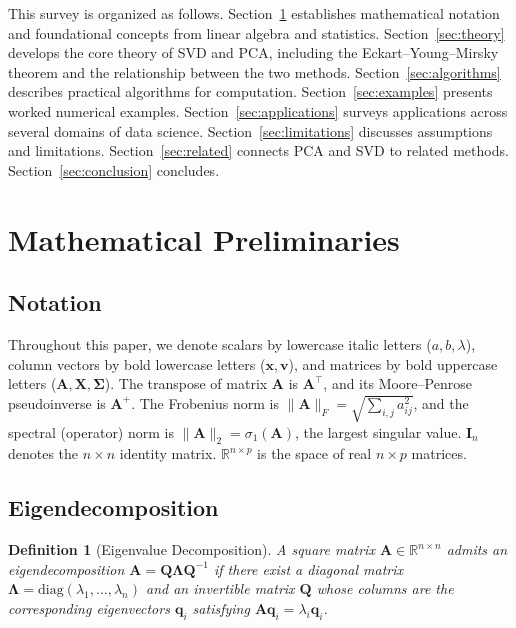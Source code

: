\documentclass[conference]{IEEEtran}
\newtheorem{definition}{Definition}
\begin{document}
This survey is organized as follows. Section~\ref{sec:prelim} establishes mathematical notation and foundational concepts from linear algebra and statistics. Section~\ref{sec:theory} develops the core theory of SVD and PCA, including the Eckart--Young--Mirsky theorem and the relationship between the two methods. Section~\ref{sec:algorithms} describes practical algorithms for computation. Section~\ref{sec:examples} presents worked numerical examples. Section~\ref{sec:applications} surveys applications across several domains of data science. Section~\ref{sec:limitations} discusses assumptions and limitations. Section~\ref{sec:related} connects PCA and SVD to related methods. Section~\ref{sec:conclusion} concludes.

\section{Mathematical Preliminaries}
\label{sec:prelim}

\subsection{Notation}

Throughout this paper, we denote scalars by lowercase italic letters ($a, b, \lambda$), column vectors by bold lowercase letters ($\mathbf{x}, \mathbf{v}$), and matrices by bold uppercase letters ($\mathbf{A}, \mathbf{X}, \mathbf{\Sigma}$). The transpose of matrix $\mathbf{A}$ is $\mathbf{A}^\top$, and its Moore--Penrose pseudoinverse is $\mathbf{A}^+$. The Frobenius norm is $\|\mathbf{A}\|_F = \sqrt{\sum_{i,j} a_{ij}^2}$, and the spectral (operator) norm is $\|\mathbf{A}\|_2 = \sigma_1(\mathbf{A})$, the largest singular value. $\mathbf{I}_n$ denotes the $n\times n$ identity matrix. $\mathbb{R}^{n \times p}$ is the space of real $n\times p$ matrices.

\subsection{Eigendecomposition}

\begin{definition}[Eigenvalue Decomposition]
A square matrix $\mathbf{A} \in \mathbb{R}^{n \times n}$ admits an \emph{eigendecomposition} $\mathbf{A} = \mathbf{Q}\mathbf{\Lambda}\mathbf{Q}^{-1}$ if there exist a diagonal matrix $\mathbf{\Lambda} = \mathrm{diag}(\lambda_1, \ldots, \lambda_n)$ and an invertible matrix $\mathbf{Q}$ whose columns are the corresponding eigenvectors $\mathbf{q}_i$ satisfying $\mathbf{A}\mathbf{q}_i = \lambda_i \mathbf{q}_i$.
\end{definition}
\end{document}

